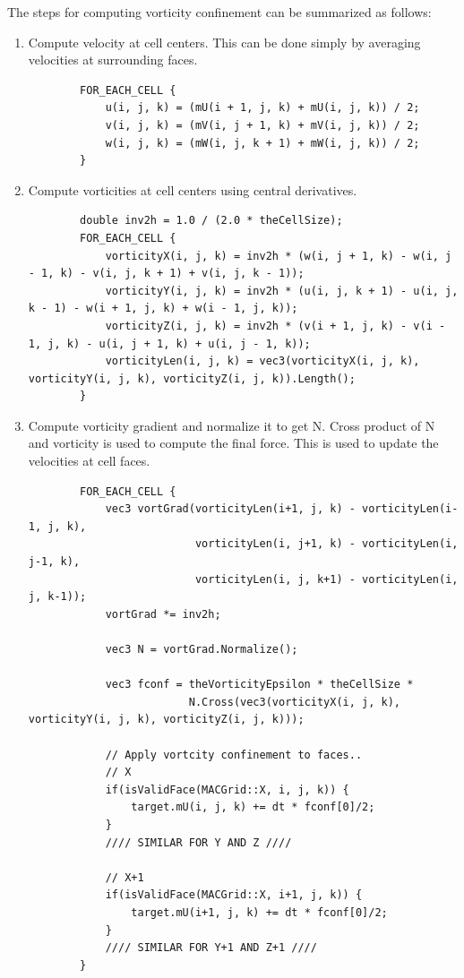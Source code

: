 \documentclass[a4paper,11pt]{article}
\theoremstyle{mytheor}
\begin{document}
\par
\noindent
The steps for computing vorticity confinement can be summarized as follows:
\begin{enumerate}
    \item Compute velocity at cell centers. 
        This can be done simply by averaging velocities at surrounding faces.
        \tiny
        \begin{verbatim}
        FOR_EACH_CELL {
            u(i, j, k) = (mU(i + 1, j, k) + mU(i, j, k)) / 2;
            v(i, j, k) = (mV(i, j + 1, k) + mV(i, j, k)) / 2;
            w(i, j, k) = (mW(i, j, k + 1) + mW(i, j, k)) / 2;
        }
        \end{verbatim}
        \normalsize
    \item Compute vorticities at cell centers using central derivatives.
        \tiny
        \begin{verbatim}  
        double inv2h = 1.0 / (2.0 * theCellSize);
        FOR_EACH_CELL {
            vorticityX(i, j, k) = inv2h * (w(i, j + 1, k) - w(i, j - 1, k) - v(i, j, k + 1) + v(i, j, k - 1));
            vorticityY(i, j, k) = inv2h * (u(i, j, k + 1) - u(i, j, k - 1) - w(i + 1, j, k) + w(i - 1, j, k));
            vorticityZ(i, j, k) = inv2h * (v(i + 1, j, k) - v(i - 1, j, k) - u(i, j + 1, k) + u(i, j - 1, k));
            vorticityLen(i, j, k) = vec3(vorticityX(i, j, k), vorticityY(i, j, k), vorticityZ(i, j, k)).Length();
        }
        \end{verbatim}  
        \normalsize
    \item Compute vorticity gradient and normalize it to get N. Cross product of N and vorticity is used to compute the final force. This is used to update the velocities at cell faces.
        \tiny
        \begin{verbatim}
        FOR_EACH_CELL {
            vec3 vortGrad(vorticityLen(i+1, j, k) - vorticityLen(i-1, j, k),
                          vorticityLen(i, j+1, k) - vorticityLen(i, j-1, k),
                          vorticityLen(i, j, k+1) - vorticityLen(i, j, k-1));
            vortGrad *= inv2h;
    
            vec3 N = vortGrad.Normalize();
    
            vec3 fconf = theVorticityEpsilon * theCellSize *
                         N.Cross(vec3(vorticityX(i, j, k), vorticityY(i, j, k), vorticityZ(i, j, k)));
    
            // Apply vortcity confinement to faces..
            // X
            if(isValidFace(MACGrid::X, i, j, k)) {
                target.mU(i, j, k) += dt * fconf[0]/2;
            }
            //// SIMILAR FOR Y AND Z ////
            
            // X+1
            if(isValidFace(MACGrid::X, i+1, j, k)) {
                target.mU(i+1, j, k) += dt * fconf[0]/2;
            }
            //// SIMILAR FOR Y+1 AND Z+1 ////
        }
        \end{verbatim}
        \normalsize
\end{enumerate}
\end{document}
